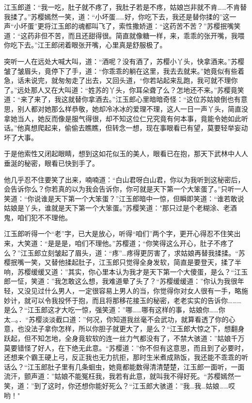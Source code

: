 \documentclass[12pt,oneside]{book}
\begin{document}
江玉郎道：``我一吃，肚子就不疼了，我肚子若是不疼，姑娘岂非就不肯\ldots\ldots 不肯替我揉了。''苏樱嫣然一笑，道：``小坏蛋\ldots\ldots 好，你吃下去，我还是替你揉的''这一声``小坏蛋''更将江玉郎的魂都叫飞了，索性撒娇道：``这药苦不苦？''苏樱抿嘴笑道：``这药非但不苦，而且还甜得很。简直就像糖一样，来，乖乖的张开嘴，我喂你吃下去。''江王郎闭着眼张开嘴，心里真是舒服极了。

突听一人在远处大喊大叫，道：``酒呢？没有酒了，苏樱小丫头，快拿酒来。''苏樱皱了皱眉头，竟停下了手，道：``你乖乖的躺在这里，我去去就来。''她竟似有些着急，话未说完，就匆匆走了出去，又回头道，``你若站起来乱跑，我可就不理你了。''远处那人又在大叫道：``姓苏的丫头，你耳朵聋了么？怎地还不来。''苏樱竟笑道：``来了来了，我这就替你拿酒去。''江玉郎心里暗暗奇怪：``这位苏姑娘倒也有意思，别人都对她那么样恭敬，她却冷冰冰的爱理不理，这人一日一声丫头，简直没拿她当人，她反而像是服气得很，却不知这位仁兄究竟有何本事，竟能令她如此听话。''他真想爬起来，偷偷去瞧瞧，但转念一想，现在事眼看已有望，莫要轻举妄动坏了大事。

于是他索性又闭起眼睛，想到这如花似玉的美人，眼看已在抱，那天下武林中人人垂涎的秘密，眼看已快到手了。

他几乎忍不住要笑了出来，喃喃道：``白山君呀白山君，你以为我听到这秘密后，会告诉你么？你若真的以为我会告诉你，你可就是天下第一个大笨蛋了。''只听一人笑道：``你说谁是天下第一个大笨蛋？''江玉郎暗中一惊，但瞬即笑道：``谁若敢说姑娘是丫头，谁就是天下第一个大笨蛋。''苏樱笑道："那只过是个老糊涂、老酒鬼，咱们犯不不理他。

江玉郎听得一个``老''字，已大是放心，听得``咱们''两个字，更开心得忍不住笑出来，大笑道：``是是是，咱们不理他。''苏樱道；``你笑得这么开心，肚子不疼了么？''江玉郎立刻皱起了眉头，道：``疼''\ldots 疼得更厉害了，求姑娘再替我揉揉。``苏樱抿嘴一笑，又替他揉起肚子，江玉郎只觉得全身发软，简直是要登天，揉了半响，苏樱缓缓又道：''其实，你心里本认为我才是天下第一个大傻蛋，是么？``江玉郎一怔，笑道：''我怎敢这么想，我难道晕了头了？``苏樱缓缓道：''你认为我很年轻，又没见过什么男人，一定很容易上男人的当，你觉得你对女人很有一手，略施妙计，就可以令我投怀于抱，而且将那移花接玉的秘密，老老实实的告诉你\ldots\ldots\ldots 是么？``江玉郎这才大吃一惊，强笑道：''哪\ldots\ldots 哪有这样的事，姑娘你\ldots\ldots 你太\ldots。．``苏樱淡淡截口道：''何况，你知道我丝毫不会武功，就算看透了你的心意，也没法子拿你怎样，所以你胆子就更大了，是么？``江玉郎大惊之下，想翻身跃起，但不知怎地，全身竟软软的连一丝力气都没有了，不禁大骇道：''姑娘千万莫要错怪了好人，在下绝无此意。``苏樱道：''你不但有这意思，而且到了必要时，还想来个霸王硬上弓，反正我也无力抗拒，那时生米煮成熟饭，我还能不乖乖的听话么？``江玉郎肚子里有几条蛔虫，她竟都能数得清清楚楚，江玉郎一面听，一面流汗，颤声道：''姑娘不能冤枉我，我若有此意，就叫我不得好死。``苏樱嫣然一笑，道：''到了这时，你还想你能好死么？``江玉郎大骇道：''我\ldots 我\ldots 姑娘\ldots\ldots 哎哟！"
\end{document}
